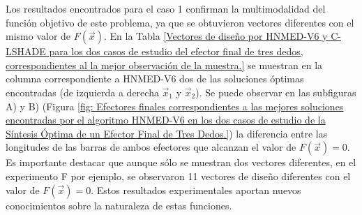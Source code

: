  Los resultados encontrados para el caso 1 confirman la multimodalidad del función objetivo de este problema, ya que se obtuvieron vectores diferentes con el mismo valor de $F(\vec{x})$. En la Tabla \ref{Vectores de diseño por HNMED-V6 y C-LSHADE para los dos casos de estudio del efector final de tres dedos, correspondientes al la mejor observación de la muestra.} se muestran en la columna correspondiente a HNMED-V6 dos de las soluciones óptimas encontradas (de izquierda a derecha $\vec{x}_1$ y $\vec{x}_2$). Se puede observar en las subfiguras A) y B) (Figura \ref{fig: Efectores finales  correspondientes a las mejores soluciones encontradas por el algoritmo HNMED-V6 en los dos casos de estudio de la Síntesis Óptima de un Efector Final de Tres Dedos.}) la diferencia entre las longitudes de las barras de ambos efectores que alcanzan el valor de $F(\vec{x})=0$. Es importante destacar que aunque sólo se muestran dos vectores diferentes, en el experimento F por ejemplo, se observaron 11 vectores de diseño diferentes con el valor de $F(\vec{x})=0$. Estos resultados experimentales aportan nuevos conocimientos sobre la naturaleza de estas funciones.

